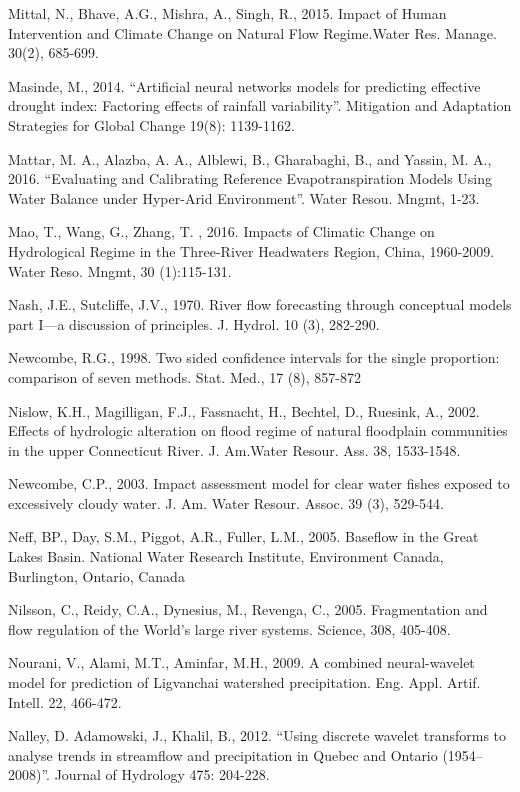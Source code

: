 \begin{hangingpar}{2em}
Mittal, N., Bhave, A.G., Mishra, A., Singh, R., 2015. Impact of Human Intervention and Climate Change on Natural Flow Regime.Water Res. Manage. 30(2), 685-699.

Masinde, M., 2014. ``Artificial neural networks models for predicting effective drought index: Factoring effects of rainfall variability''. Mitigation and Adaptation Strategies for Global Change 19(8): 1139-1162.

Mattar, M. A., Alazba, A. A., Alblewi, B., Gharabaghi, B., and Yassin, M. A., 2016. ``Evaluating and Calibrating Reference Evapotranspiration Models Using Water Balance under Hyper-Arid Environment''. Water Resou. Mngmt, 1-23. 

Mao, T., Wang, G., Zhang, T.	, 2016. Impacts of Climatic Change on Hydrological Regime in the Three-River Headwaters Region, China, 1960-2009. Water Reso. Mngmt,	30 (1):115-131.

Nash, J.E., Sutcliffe, J.V., 1970. River flow forecasting through conceptual models part I—a discussion of principles. J. Hydrol. 10 (3), 282-290.

Newcombe, R.G., 1998. Two sided confidence intervals for the single proportion: comparison of seven methods. Stat. Med., 17 (8), 857-872

Nislow, K.H., Magilligan, F.J., Fassnacht, H., Bechtel, D., Ruesink, A., 2002. Effects of hydrologic alteration on flood regime of natural floodplain communities in the upper Connecticut River. J.  Am.Water Resour. Ass. 38, 1533-1548.

Newcombe, C.P., 2003. Impact assessment model for clear water fishes exposed to excessively cloudy water. J. Am. Water Resour. Assoc. 39 (3), 529-544. 

Neff, BP., Day, S.M., Piggot, A.R., Fuller, L.M., 2005. Baseflow in the Great Lakes Basin. National Water Research Institute, Environment Canada, Burlington, Ontario, Canada 

Nilsson, C., Reidy, C.A., Dynesius, M., Revenga, C., 2005. Fragmentation and flow regulation of the World’s large river systems. Science, 308, 405-408.

Nourani, V., Alami, M.T., Aminfar, M.H., 2009. A combined neural-wavelet model for prediction of Ligvanchai watershed precipitation. Eng. Appl. Artif. Intell. 22, 466-472. 

Nalley, D. Adamowski, J., Khalil, B., 2012. ``Using discrete wavelet transforms to analyse trends in streamflow and precipitation in Quebec and Ontario (1954–2008)''. Journal of Hydrology 475: 204-228.


\end{hangingpar}

